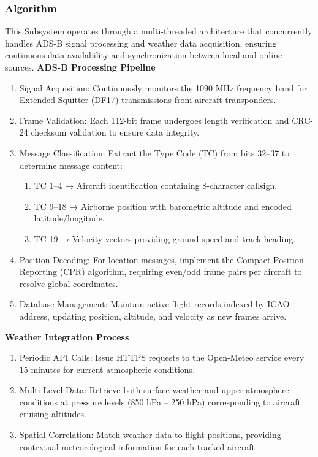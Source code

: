 \subsubsection{Algorithm}
This Subsystem operates through a multi-threaded architecture that concurrently handles ADS-B signal processing and weather data acquisition, ensuring continuous data availability and synchronization between local and online sources.
\newline
\textbf{ADS-B Processing Pipeline}
\begin{enumerate}   
    \item Signal Acquisition: Continuously monitors the 1090 MHz frequency band for Extended Squitter (DF17) transmissions from aircraft transponders.
    \item Frame Validation: Each 112-bit frame undergoes length verification and CRC-24 checksum validation to ensure data integrity.
    \item Message Classification: Extract the Type Code (TC) from bits 32–37 to determine message content:
    \begin{enumerate}
        \item TC 1–4 → Aircraft identification containing 8-character callsign.
        \item TC 9–18 → Airborne position with barometric altitude and encoded latitude/longitude.
        \item TC 19 → Velocity vectors providing ground speed and track heading.
    \end{enumerate}
    \item Position Decoding: For location messages, implement the Compact Position Reporting (CPR) algorithm, requiring even/odd frame pairs per aircraft to resolve global coordinates.
    \item Database Management: Maintain active flight records indexed by ICAO address, updating position, altitude, and velocity as new frames arrive.
\end{enumerate}

\textbf{Weather Integration Process}
\begin{enumerate}
    \item Periodic API Calls: Issue HTTPS requests to the Open-Meteo service every 15 minutes for current atmospheric conditions.
    \item Multi-Level Data: Retrieve both surface weather and upper-atmosphere conditions at pressure levels (850 hPa – 250 hPa) corresponding to aircraft cruising altitudes.
    \item Spatial Correlation: Match weather data to flight positions, providing contextual meteorological information for each tracked aircraft.
\end{enumerate}

